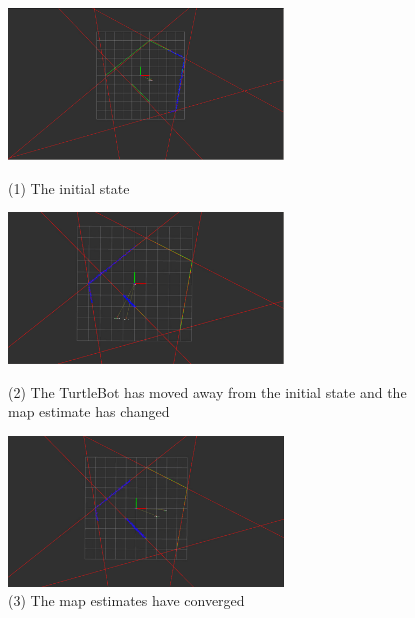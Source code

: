 \documentclass{article}
\begin{document}
\begin{enumerate}[label=(\roman*)]
\begin{figure}[H]
    \begin{center}
    \includegraphics[width=0.65\textwidth]{P2_Screenshots/1initial.PNG}
    \caption*{(1) The initial state}
    \includegraphics[width=0.65\textwidth]{P2_Screenshots/2moved.PNG}
    \caption*{(2) The TurtleBot has moved away from the initial state and the map estimate has changed}
    \includegraphics[width=0.65\textwidth]{P2_Screenshots/3converged.PNG}
    \caption*{(3) The map estimates have converged}
    \end{center}
\end{figure}

\end{enumerate}

\newpage
\end{document}
